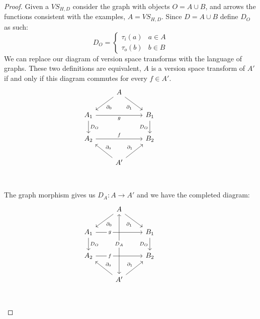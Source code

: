 \documentclass{article}
\theoremstyle{definition}
\begin{document}
\begin{proof}
Given a $VS_{H,D}$ consider the graph with objects $O=A\cup B$, and arrows the functions consistent with the examples, $A=VS_{H,D}$. Since $D = A\cup B$ define $D_O$ as such:
\begin{equation}
    D_O=\begin{cases} 
      \tau_i(a) & a \in A\\
      \tau_o(b) & b \in B 
   \end{cases}
\end{equation}
We can replace our diagram of version space transforms with the language of graphs. These two definitions are equivalent, $A$ is a version space transform of $A'$ if and only if this diagram commutes for every $f\in A'$.
\[\begin{tikzcd}
	& A \\
	{A_1} && {B_1} \\
	{A_2} && {B_2} \\
	& {A'} \\
	&&& {}
	\arrow["{\partial_0}", from=1-2, to=2-1]
	\arrow["{\partial_1}"', from=1-2, to=2-3]
	\arrow["{D_O}", from=2-1, to=3-1]
	\arrow["{D_O}"', from=2-3, to=3-3]
	\arrow["{\partial_0}"', from=4-2, to=3-1]
	\arrow["{\partial_1}", from=4-2, to=3-3]
	\arrow["g"', from=2-1, to=2-3]
	\arrow["f", from=3-1, to=3-3]
\end{tikzcd}\]
The graph morphism gives us $D_A: A\rightarrow A'$ and we have the completed diagram: 
\[\begin{tikzcd}
	& A \\
	{A_1} && {B_1} \\
	{A_2} && {B_2} \\
	& {A'} \\
	&&& {}
	\arrow["{\partial_0}", from=1-2, to=2-1]
	\arrow["{\partial_1}"', from=1-2, to=2-3]
	\arrow["{D_O}", from=2-1, to=3-1]
	\arrow["{D_O}"', from=2-3, to=3-3]
	\arrow["{\partial_0}"', from=4-2, to=3-1]
	\arrow["{\partial_1}", from=4-2, to=3-3]
	\arrow["g"{description, pos=0.3}, from=2-1, to=2-3]
	\arrow["f"{description, pos=0.3}, from=3-1, to=3-3]
	\arrow["{D_A}"{description}, <->, from=1-2, to=4-2]
\end{tikzcd}\]


\end{proof}
\end{document}
